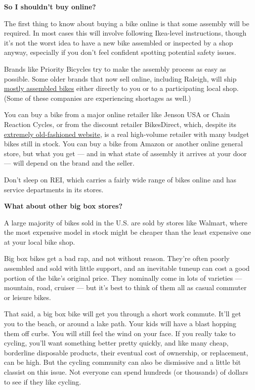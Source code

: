 \textbf{So I shouldn't buy online?}

The first thing to know about buying a bike online is that some assembly
will be required. In most cases this will involve following Ikea-level
instructions, though it's not the worst idea to have a new bike
assembled or inspected by a shop anyway, especially if you don't feel
confident spotting potential safety issues.

Brands like Priority Bicycles try to make the assembly process as easy
as possible. Some older brands that now sell online, including Raleigh,
will ship \href{https://youtu.be/hmu03iLcVSM}{mostly assembled bikes}
either directly to you or to a participating local shop. (Some of these
companies are experiencing shortages as well.)

You can buy a bike from a major online retailer like Jenson USA or Chain
Reaction Cycles, or from the discount retailer BikesDirect, which,
despite its \href{http://www.bikesdirect.com/}{extremely old-fashioned
website}, is a real high-volume retailer with many budget bikes still in
stock. You can buy a bike from Amazon or another online general store,
but what you get --- and in what state of assembly it arrives at your
door --- will depend on the brand and the seller.

Don't sleep on REI, which carries a fairly wide range of bikes online
and has service departments in its stores.

\textbf{What about other big box stores?}

A large majority of bikes sold in the U.S. are sold by stores like
Walmart, where the most expensive model in stock might be cheaper than
the least expensive one at your local bike shop.

Big box bikes get a bad rap, and not without reason. They're often
poorly assembled and sold with little support, and an inevitable tuneup
can cost a good portion of the bike's original price. They nominally
come in lots of varieties --- mountain, road, cruiser --- but it's best
to think of them all as casual commuter or leisure bikes.

That said, a big box bike will get you through a short work commute.
It'll get you to the beach, or around a lake path. Your kids will have a
blast hopping them off curbs. You will still feel the wind on your face.
If you really take to cycling, you'll want something better pretty
quickly, and like many cheap, borderline disposable products, their
eventual cost of ownership, or replacement, can be high. But the cycling
community can also be dismissive and a little bit classist on this
issue. Not everyone can spend hundreds (or thousands) of dollars to see
if they like cycling.

